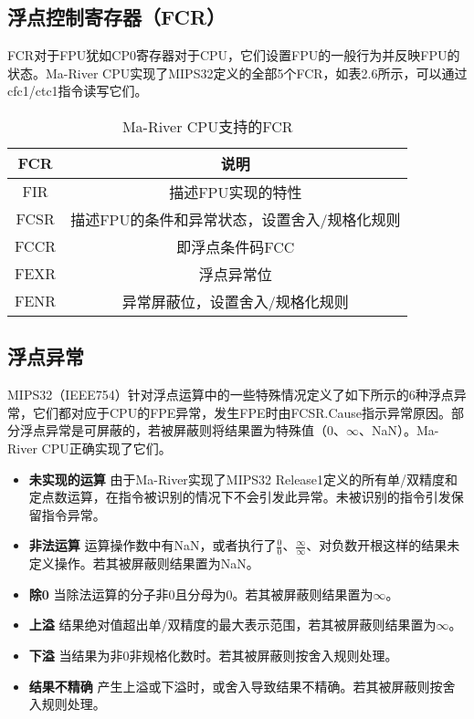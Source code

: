 \subsection{浮点控制寄存器（FCR）}

FCR对于FPU犹如CP0寄存器对于CPU，它们设置FPU的一般行为并反映FPU的状态。Ma-River CPU实现了MIPS32定义的全部5个FCR，如表2.6所示，可以通过cfc1/ctc1指令读写它们。

\begin{table}[htbp]
\centering
\caption{Ma-River CPU支持的FCR}
    \label{fig:enter-label}
\begin{tabular}{c|c}
\hline  %
\textbf{FCR} & \textbf{说明}\\
\hline
FIR & 描述FPU实现的特性\\
FCSR & 描述FPU的条件和异常状态，设置舍入/规格化规则\\
FCCR & 即浮点条件码FCC\\
FEXR & 浮点异常位\\
FENR & 异常屏蔽位，设置舍入/规格化规则\\
\hline

\end{tabular}

\end{table}

\subsection{浮点异常}

MIPS32（IEEE754）针对浮点运算中的一些特殊情况定义了如下所示的6种浮点异常，它们都对应于CPU的FPE异常，发生FPE时由FCSR.Cause指示异常原因。部分浮点异常是可屏蔽的，若被屏蔽则将结果置为特殊值（0、$\infty$、NaN）。Ma-River CPU正确实现了它们。

\begin{itemize}
    \item \textbf{未实现的运算} \quad 由于Ma-River实现了MIPS32 Release1定义的所有单/双精度和定点数运算，在指令被识别的情况下不会引发此异常。未被识别的指令引发保留指令异常。
    \item \textbf{非法运算} \quad 运算操作数中有NaN，或者执行了$\frac 0 0$、$\frac{\infty}{\infty}$、对负数开根这样的结果未定义操作。若其被屏蔽则结果置为NaN。
    \item \textbf{除0} \quad 当除法运算的分子非0且分母为0。若其被屏蔽则结果置为$\infty$。
    \item \textbf{上溢} \quad 结果绝对值超出单/双精度的最大表示范围，若其被屏蔽则结果置为$\infty$。
    \item \textbf{下溢} \quad 当结果为非0非规格化数时。若其被屏蔽则按舍入规则处理。
    \item \textbf{结果不精确} \quad 产生上溢或下溢时，或舍入导致结果不精确。若其被屏蔽则按舍入规则处理。
\end{itemize}

